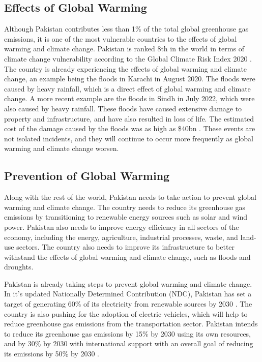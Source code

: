 \documentclass{article}
\begin{document}
\subsection{Effects of Global Warming}
Although Pakistan contributes less than 1\% of the total global greenhouse gas
emissions, it is one of the most vulnerable countries to the effects of global
warming and climate change. Pakistan is ranked 8th in the world in terms of
climate change vulnerability according to the Global Climate Risk Index 2020
\cite{Eckstein_Künzel_Schäfer_Winges}. The country is already experiencing the
effects of global warming and climate change, an example being the floods in
Karachi in August 2020. The floods were caused by heavy rainfall, which is a
direct effect of global warming and climate change. A more recent example are
the floods in Sindh in July 2022, which were also caused by heavy rainfall.
These floods have caused extensive damage to property and infrastructure, and
have also resulted in loss of life. The estimated cost of the damage caused by
the floods was as high as \$40bn \cite{Javaid_2022}. These events are not
isolated incidents, and they will continue to occur more frequently as global
warming and climate change worsen.

\subsection{Prevention of Global Warming}
Along with the rest of the world, Pakistan needs to take action to prevent
global warming and climate change. The country needs to reduce its greenhouse
gas emissions by transitioning to renewable energy sources such as solar and
wind power. Pakistan also needs to improve energy efficiency in all sectors of
the economy, including the energy, agriculture, industrial processes, waste,
and land-use sectors. The country also needs to improve its infrastructure to
better withstand the effects of global warming and climate change, such as
floods and droughts.

Pakistan is already taking steps to prevent global warming and climate change.
In it's updated Nationally Determined Contribution (NDC), Pakistan has set a
target of generating 60\% of its electricity from renewable sources by 2030
\cite{UNDP_Climate_Promise}. The country is also pushing for the adoption of
electric vehicles, which will help to reduce greenhouse gas emissions from the
transportation sector. Pakistan intends to reduce its greenhouse gas emissions
by 15\% by 2030 using its own resources, and by 30\% by 2030 with international
support with an overall goal of reducing its emissions by 50\% by 2030
\cite{UNDP_Climate_Promise}.
\end{document}
